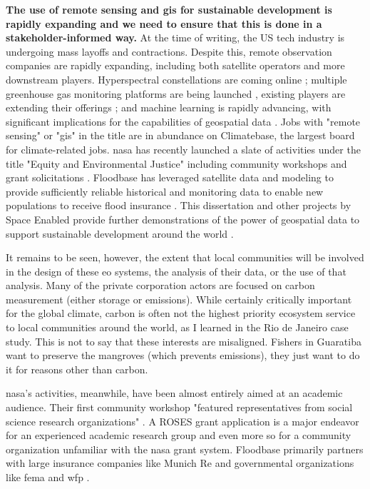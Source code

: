 \textbf{The use of remote sensing and \ac{gis} for sustainable development is rapidly expanding and we need to ensure that this is done in a stakeholder-informed way.} At the time of writing, the US tech industry is undergoing mass layoffs and contractions. Despite this, remote observation companies are rapidly expanding, including both satellite operators and more downstream players. Hyperspectral constellations are coming online \cite{planetlabspbcPlanetAnnouncesNew2022, rainbowPixxelRaises252022}; multiple greenhouse gas monitoring platforms are being launched \cite{clarkExclusiveSatelliteImages2022, brownSecurityCameraPlanet2023}, existing players are extending their offerings \cite{jewettPlanetDebutsPlanetary2022}; and machine learning is rapidly advancing, with significant implications for the capabilities of geospatial data \cite{joyceCanYouUse2023}. Jobs with "remote sensing" or "\ac{gis}" in the title are in abundance on Climatebase, the largest board for climate-related jobs. \ac{nasa} has recently launched a slate of activities under the title "Equity and Environmental Justice" including community workshops and grant solicitations \cite{bollesEquityEnvironmentalJustice2021}. Floodbase has leveraged satellite data and modeling to provide sufficiently reliable historical and monitoring data to enable new populations to receive flood insurance \cite{tellmanRegionalIndexInsurance2022}. This dissertation and other projects by Space Enabled provide further demonstrations of the power of geospatial data to support sustainable development around the world \cite{lombardoDevelopmentDecisionSupport2021, lombardoEnvironmentVulnerabilityDecisionTechnologyFrameworkDecision2022, ovienmhadaInclusiveDesignEarth2021, ovienmhadaEnvironmentVulnerabilityDecisionTechnologyModelingFramework2021}. 

It remains to be seen, however, the extent that local communities will be involved in the design of these \ac{eo} systems, the analysis of their data, or the use of that analysis. Many of the private corporation actors are focused on carbon measurement (either storage or emissions). While certainly critically important for the global climate, carbon is often not the highest priority ecosystem service to local communities around the world, as I learned in the Rio de Janeiro case study. This is not to say that these interests are misaligned. Fishers in Guaratiba want to preserve the mangroves (which prevents emissions), they just want to do it for reasons other than carbon. 

\ac{nasa}'s activities, meanwhile, have been almost entirely aimed at an academic audience. Their first community workshop "featured representatives from social science research organizations" \cite{bollesEquityEnvironmentalJustice2021}. A ROSES grant application is a major endeavor for an experienced academic research group and even more so for a community organization unfamiliar with the \ac{nasa} grant system. Floodbase primarily partners with large insurance companies like Munich Re and governmental organizations like \ac{fema} and \ac{wfp} \cite{floodbaseFloodMonitoringSudan2022, floodbaseAnnouncingOurWork2023, rostonClimateStartupAims2023}.

